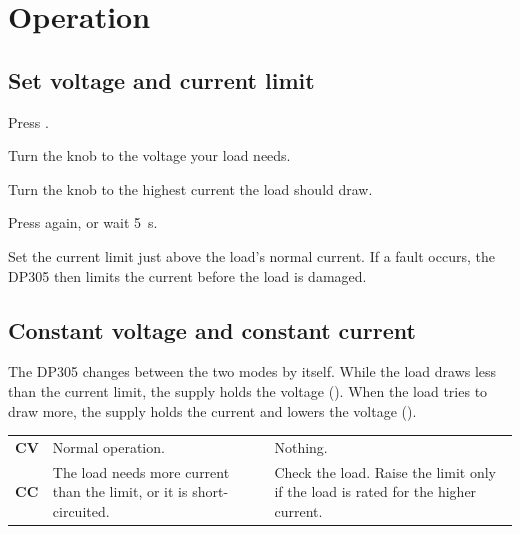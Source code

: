 \documentclass[type=manual, lang=en-GB, otherlangs={zh-HK}]{plaindoc}
\begin{document}
\chapter{Operation}

\section{Set voltage and current limit}
\label{sec:set}

\begin{steps}
\item Press .
\item Turn the  knob to the voltage your load needs.
\item Turn the  knob to the highest current the load should draw.
\item Press  again, or wait \qty{5}{\s}.
\end{steps}

\begin{note}
Set the current limit just above the load's normal current. If a fault
occurs, the DP305 then limits the current before the load is damaged.
\end{note}

\section{Constant voltage and constant current}

The DP305 changes between the two modes by itself. While the load draws less
than the current limit, the supply holds the voltage (). When the load
tries to draw more, the supply holds the current and lowers the voltage
().

\begin{tabularx}{\linewidth}{@{}P{24mm}LL@{}}
\toprule
{} &  &  \\
\midrule
\textbf{CV} & Normal operation. & Nothing. \\
\textbf{CC} & The load needs more current than the limit, or it is short-circuited. &
  Check the load. Raise the limit only if the load is rated for the higher current. \\
\bottomrule
\end{tabularx}
\end{document}
